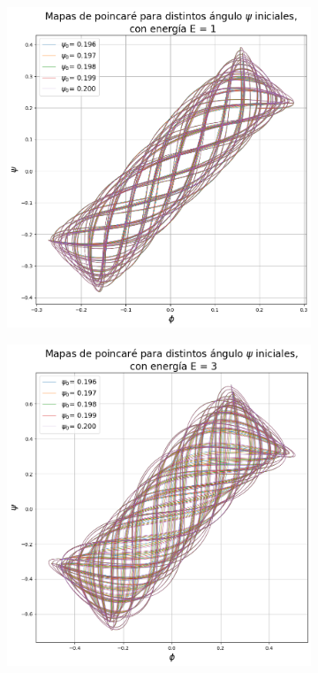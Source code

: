 \documentclass[11pt, twoside]{article} %
\begin{document}
\begin{figure}
    \begin{subfigure}{.5\textwidth}
      \centering
      \includegraphics[width=\linewidth]{plots/poincare_estabilidad_E_1.png}
      \label{fig:poincare_estabilidad_E_1}
    \end{subfigure}%
    \begin{subfigure}{.5\textwidth}
      \centering
      \includegraphics[width=\linewidth]{plots/poincare_estabilidad_E_3.png}

\end{subfigure}
\end{figure}
\end{document}
